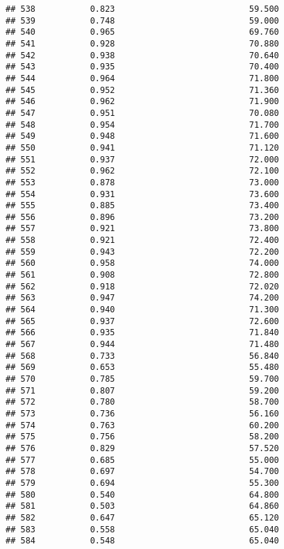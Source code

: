 \documentclass[
]{article}
\begin{document}
\begin{verbatim}
## 538           0.823                           59.500
## 539           0.748                           59.000
## 540           0.965                           69.760
## 541           0.928                           70.880
## 542           0.938                           70.640
## 543           0.935                           70.400
## 544           0.964                           71.800
## 545           0.952                           71.360
## 546           0.962                           71.900
## 547           0.951                           70.080
## 548           0.954                           71.700
## 549           0.948                           71.600
## 550           0.941                           71.120
## 551           0.937                           72.000
## 552           0.962                           72.100
## 553           0.878                           73.000
## 554           0.931                           73.600
## 555           0.885                           73.400
## 556           0.896                           73.200
## 557           0.921                           73.800
## 558           0.921                           72.400
## 559           0.943                           72.200
## 560           0.958                           74.000
## 561           0.908                           72.800
## 562           0.918                           72.020
## 563           0.947                           74.200
## 564           0.940                           71.300
## 565           0.937                           72.600
## 566           0.935                           71.840
## 567           0.944                           71.480
## 568           0.733                           56.840
## 569           0.653                           55.480
## 570           0.785                           59.700
## 571           0.807                           59.200
## 572           0.780                           58.700
## 573           0.736                           56.160
## 574           0.763                           60.200
## 575           0.756                           58.200
## 576           0.829                           57.520
## 577           0.685                           55.000
## 578           0.697                           54.700
## 579           0.694                           55.300
## 580           0.540                           64.800
## 581           0.503                           64.860
## 582           0.647                           65.120
## 583           0.558                           65.040
## 584           0.548                           65.040

\end{verbatim}
\end{document}
